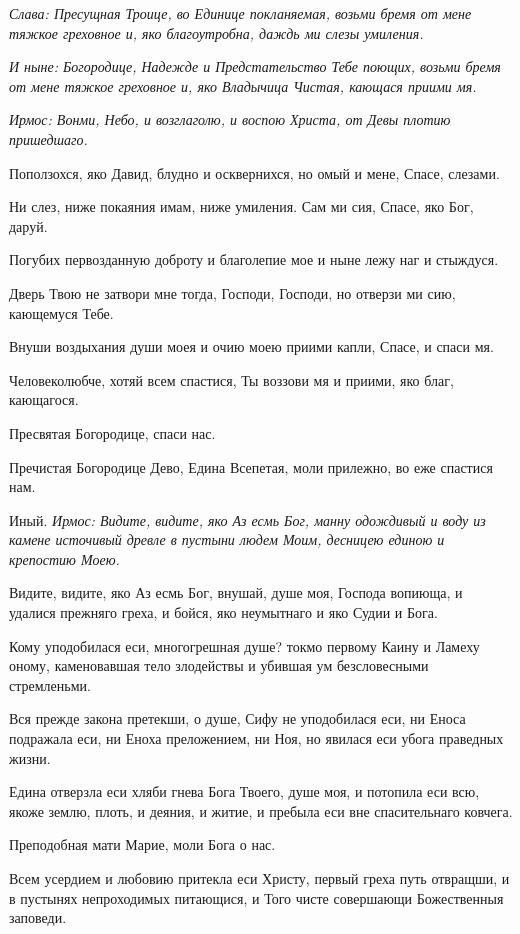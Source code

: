 \itshape Слава\normalfont{}: Пресущная Троице, во Единице покланяемая, возьми бремя от мене тяжкое греховное и, яко благоутробна, даждь ми слезы умиления. 

\itshape И ныне\normalfont{}: Богородице, Надежде и Предстательство Тебе поющих, возьми бремя от мене тяжкое греховное и, яко Владычица Чистая, кающася приими мя. 


\itshape Ирмос\normalfont{}: Вонми, Небо, и возглаголю, и воспою Христа, от Девы плотию пришедшаго. 

Поползохся, яко Давид, блудно и осквернихся, но омый и мене, Спасе, слезами. 

Ни слез, ниже покаяния имам, ниже умиления. Сам ми сия, Спасе, яко Бог, даруй. 

Погубих первозданную доброту и благолепие мое и ныне лежу наг и стыждуся. 

Дверь Твою не затвори мне тогда, Господи, Господи, но отверзи ми сию, кающемуся Тебе. 

Внуши воздыхания души моея и очию моею приими капли, Спасе, и спаси мя. 

Человеколюбче, хотяй всем спастися, Ты воззови мя и приими, яко благ, кающагося. 

Пресвятая Богородице, спаси нас. 

Пречистая Богородице Дево, Едина Всепетая, моли прилежно, во еже спастися нам. 

Иный. \itshape Ирмос\normalfont{}: Видите, видите, яко Аз есмь Бог, манну одождивый и воду из камене источивый древле в пустыни людем Моим, десницею единою и крепостию Моею. 

Видите, видите, яко Аз есмь Бог, внушай, душе моя, Господа вопиюща, и удалися прежняго греха, и бойся, яко неумытнаго и яко Судии и Бога. 

Кому уподобилася еси, многогрешная душе? токмо первому Каину и Ламеху оному, каменовавшая тело злодействы и убившая ум безсловесными стремленьми. 

Вся прежде закона претекши, о душе, Сифу не уподобилася еси, ни Еноса подражала еси, ни Еноха преложением, ни Ноя, но явилася еси убога праведных жизни. 

Едина отверзла еси хляби гнева Бога Твоего, душе моя, и потопила еси всю, якоже землю, плоть, и деяния, и житие, и пребыла еси вне спасительнаго ковчега. 

Преподобная мати Марие, моли Бога о нас. 

Всем усердием и любовию притекла еси Христу, первый греха путь отвращши, и в пустынях непроходимых питающися, и Того чисте совершающи Божественныя заповеди. 

